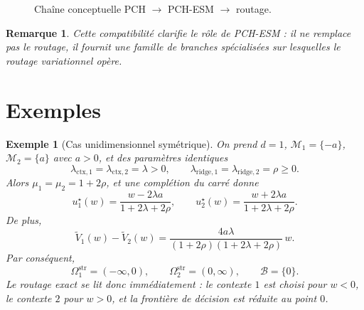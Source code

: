 \documentclass[11pt,a4paper]{article}
\newtheorem{remark}{Remarque}[section]
\newtheorem{example}{Exemple}[section]
\DeclareMathOperator{\argmin}{argmin}
\newcommand{\Mcal}{\mathcal M}
\newcommand{\Bcal}{\mathcal B}
\begin{document}
\begin{figure}[ht]
\centering
{}
\caption{Chaîne conceptuelle PCH \(\rightarrow\) PCH-ESM \(\rightarrow\) routage.}
\end{figure}

\begin{remark}
Cette compatibilité clarifie le rôle de PCH-ESM : il ne remplace pas le routage, il fournit une famille de branches spécialisées sur lesquelles le routage variationnel opère.
\end{remark}

\section{Exemples}

\begin{example}[Cas unidimensionnel symétrique]
On prend \(d=1\), \(\Mcal_1=\{-a\}\), \(\Mcal_2=\{a\}\) avec \(a>0\), et des paramètres identiques
\[
\lambda_{\mathrm{ctx},1}=\lambda_{\mathrm{ctx},2}=\lambda>0,
\qquad
\lambda_{\mathrm{ridge},1}=\lambda_{\mathrm{ridge},2}=\rho\ge 0.
\]
Alors \(\mu_1=\mu_2=1+2\rho\), et une complétion du carré donne
\[
u_1^\star(w)=\frac{w-2\lambda a}{1+2\lambda+2\rho},
\qquad
u_2^\star(w)=\frac{w+2\lambda a}{1+2\lambda+2\rho}.
\]
De plus,
\[
\widetilde V_1(w)-\widetilde V_2(w)
=
\frac{4a\lambda}{(1+2\rho)(1+2\lambda+2\rho)}\,w.
\]
Par conséquent,
\[
\Omega_1^{\mathrm{str}}=(-\infty,0),
\qquad
\Omega_2^{\mathrm{str}}=(0,\infty),
\qquad
\Bcal=\{0\}.
\]
Le routage exact se lit donc immédiatement : le contexte \(1\) est choisi pour \(w<0\), le contexte \(2\) pour \(w>0\), et la frontière de décision est réduite au point \(0\).
\end{example}
\end{document}
